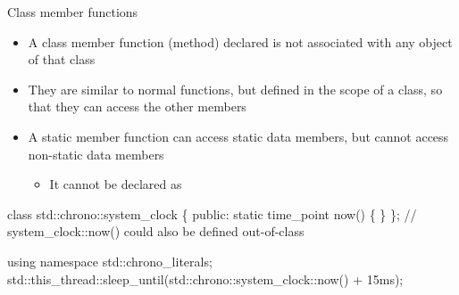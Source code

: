 \begin{frame}[fragile]{Class  member functions}

  \begin{itemize}
  \item A class member function (method) declared \alert{} is not
    associated with any object of that class
  \item They are similar to normal functions, but defined in the scope of a
    class, so that they can access the other members
  \item A static member function can access static data members, but cannot
    access non-static data members
    \begin{itemize}
    \item It cannot be declared as 
    \end{itemize}
  \end{itemize}
  \begin{codeblock}
class std::chrono::system_clock \{
 public:
  static time_point now() \{ \ddd \}
  \ddd
\};
// system_clock::now() could also be defined out-of-class\end{codeblock}
    \begin{codeblock}
using namespace std::chrono_literals;
std::this_thread\alert{::}sleep_until(std::chrono::system_clock\alert{::}now() + 15ms);\end{codeblock}

\end{frame}
